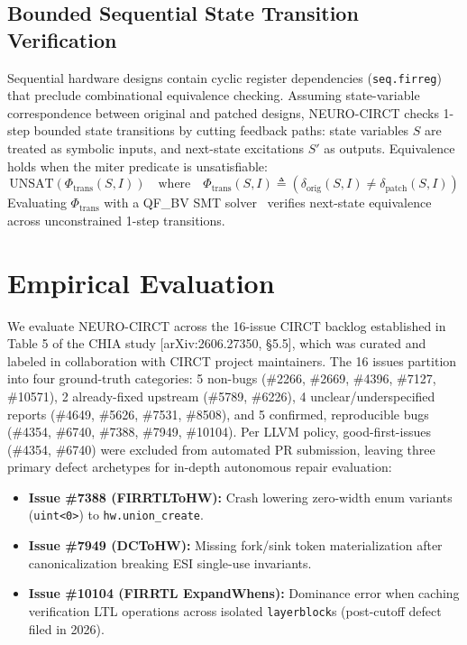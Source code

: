 \documentclass[conference]{IEEEtran}
\begin{document}
\subsection{Bounded Sequential State Transition Verification}
Sequential hardware designs contain cyclic register dependencies (\texttt{seq.firreg}) that preclude combinational equivalence checking. Assuming state-variable correspondence between original and patched designs, NEURO-CIRCT checks 1-step bounded state transitions by cutting feedback paths: state variables $S$ are treated as symbolic inputs, and next-state excitations $S'$ as outputs. Equivalence holds when the miter predicate is unsatisfiable:
\begin{equation}
\text{UNSAT}(\Phi_{\text{trans}}(S, I)) \quad \text{where} \quad \Phi_{\text{trans}}(S, I) \triangleq \left( \delta_{\text{orig}}(S, I) \neq \delta_{\text{patch}}(S, I) \right)
\end{equation}
Evaluating $\Phi_{\text{trans}}$ with a QF\_BV SMT solver~\cite{demoura2008z3, niemetz2023bitwuzla} verifies next-state equivalence across unconstrained 1-step transitions.

\section{Empirical Evaluation}
We evaluate NEURO-CIRCT across the 16-issue CIRCT backlog established in Table 5 of the CHIA study [arXiv:2606.27350, \S5.5], which was curated and labeled in collaboration with CIRCT project maintainers. The 16 issues partition into four ground-truth categories: 5 non-bugs (\#2266, \#2669, \#4396, \#7127, \#10571), 2 already-fixed upstream (\#5789, \#6226), 4 unclear/underspecified reports (\#4649, \#5626, \#7531, \#8508), and 5 confirmed, reproducible bugs (\#4354, \#6740, \#7388, \#7949, \#10104). Per LLVM policy, good-first-issues (\#4354, \#6740) were excluded from automated PR submission, leaving three primary defect archetypes for in-depth autonomous repair evaluation:
\begin{itemize}
    \item \textbf{Issue \#7388 (FIRRTLToHW):} Crash lowering zero-width enum variants (\texttt{uint<0>}) to \texttt{hw.union\_create}.
    \item \textbf{Issue \#7949 (DCToHW):} Missing fork/sink token materialization after canonicalization breaking ESI single-use invariants.
    \item \textbf{Issue \#10104 (FIRRTL ExpandWhens):} Dominance error when caching verification LTL operations across isolated \texttt{layerblock}s (post-cutoff defect filed in 2026).
\end{itemize}
\end{document}
